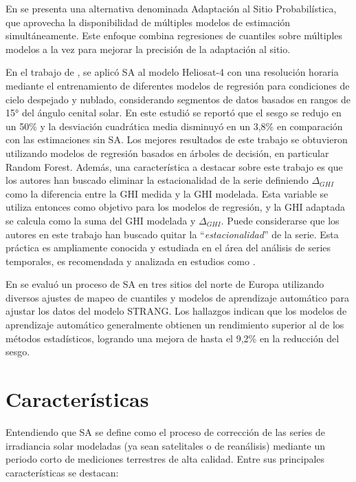 En \citep{YANG2021} se presenta una alternativa denominada Adaptación al Sitio Probabilística, que aprovecha la disponibilidad de múltiples modelos de estimación simultáneamente. Este enfoque combina regresiones de cuantiles sobre múltiples modelos a la vez para mejorar la precisión de la adaptación al sitio.

En el trabajo de \citep{SALAMALIKIS2022}, se aplicó SA al modelo Heliosat-4 con una resolución horaria mediante el entrenamiento de diferentes modelos de regresión para condiciones de cielo despejado y nublado, considerando segmentos de datos basados en rangos de 15° del ángulo cenital solar. En este estudió se reportó  que el sesgo se redujo en un 50\% y la desviación cuadrática media disminuyó en un 3,8\% en comparación con las estimaciones sin SA. Los mejores resultados de este trabajo se obtuvieron utilizando modelos de regresión basados en árboles de decisión, en particular Random Forest. Además, una característica a destacar sobre este trabajo es que los autores han buscado eliminar la estacionalidad de la serie definiendo $\Delta_{GHI}$ como la diferencia entre la GHI medida y la GHI modelada. Esta variable se utiliza entonces como objetivo para los modelos de regresión, y la GHI adaptada se calcula como la suma del GHI modelada y $\Delta_{GHI}$. Puede considerarse que los autores en este trabajo han buscado quitar la \enquote{\textit{estacionalidad}} de la serie. Esta práctica es ampliamente conocida y estudiada en el área del análisis de series temporales, es recomendada y analizada en estudios como \citep{THORNTON2013, Claveria2015}.   


En \citep{ZAINALI2024} se evaluó un proceso de SA en tres sitios del norte de Europa utilizando diversos ajustes de mapeo de cuantiles y modelos de aprendizaje automático para ajustar los datos del modelo STRANG. Los hallazgos indican que los modelos de aprendizaje automático generalmente obtienen un rendimiento superior al de los métodos estadísticos, logrando una mejora de hasta el 9,2\% en la reducción del sesgo.


\section{Características}

Entendiendo que SA se define como el proceso de corrección de las series de irradiancia solar modeladas (ya sean satelitales o de reanálisis) mediante un periodo corto de mediciones terrestres de alta calidad. Entre sus principales características se destacan:

